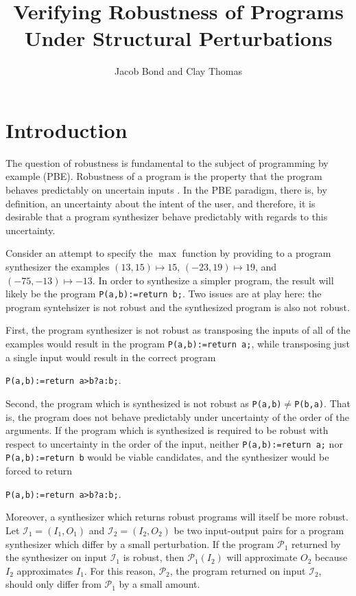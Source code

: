 \documentclass{llncs}
\title{Verifying Robustness of Programs Under Structural Perturbations}
\author{Jacob Bond and Clay Thomas}
\institute{Purdue University}
\begin{document}
\maketitle


\section{Introduction}

The question of robustness is fundamental to the subject of programming by example (PBE).  Robustness of a program is the property that the program behaves predictably on uncertain inputs \cite{chaudhuri12}.  In the PBE paradigm, there is, by definition, an uncertainty about the intent of the user, and therefore, it is desirable that a program synthesizer behave predictably with regards to this uncertainty.

Consider an attempt to specify the \(\max\) function by providing to a program synthesizer the examples \((13, 15) \mapsto 15\), \((-23, 19) \mapsto 19\), and \((-75, -13) \mapsto -13\).  In order to synthesize a simpler program, the result will likely be the program \verb!P(a,b):=return b;!.  Two issues are at play here: the program syntehsizer is not robust and the synthesized program is also not robust.

First, the program synthesizer is not robust as transposing the inputs of all of the examples would result in the program \verb!P(a,b):=return a;!, while transposing just a single input would result in the correct program

\hspace{2\parindent}\verb!P(a,b):=return a>b?a:b;!.

Second, the program which is synthesized is not robust as \verb!P(a,b)!\(\not=\)\verb!P(b,a)!.  That is, the program does not behave predictably under uncertainty of the order of the arguments.  If the program which is synthesized is required to be robust with respect to uncertainty in the order of the input, neither \verb!P(a,b):=return a;! nor \verb!P(a,b):=return b! would be viable candidates, and the synthesizer would be forced to return

\hspace{2\parindent}\verb!P(a,b):=return a>b?a:b;!.

Moreover, a synthesizer which returns robust programs will itself be more robust.  Let \(\mathcal{I}_{1} = (I_{1}, O_{1})\) and \(\mathcal{I}_{2} = (I_{2}, O_{2})\) be two input-output pairs for a program synthesizer which differ by a small perturbation.  If the program \(\mathcal{P}_{1}\) returned by the synthesizer on input \(\mathcal{I}_{1}\) is robust, then \(\mathcal{P}_{1}(I_{2})\) will approximate \(O_{2}\) because \(I_{2}\) approximates \(I_{1}\).  For this reason, \(\mathcal{P}_{2}\), the program returned on input \(\mathcal{I}_{2}\), should only differ from \(\mathcal{P}_{1}\) by a small amount.
\end{document}
